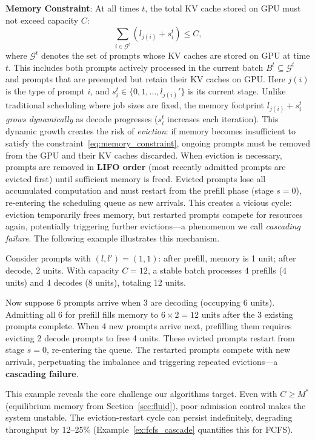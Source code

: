 \textbf{Memory Constraint}: At all times $t$, the total KV cache stored on GPU must not exceed capacity $C$:
\begin{equation}
\label{eq:memory_constraint}
\sum_{i \in \mathcal{G}^t} (l_{j(i)} + s^t_i) \le C,
\end{equation}
where $\mathcal{G}^t$ denotes the set of prompts whose KV caches are stored on GPU at time $t$. This includes both prompts actively processed in the current batch $B^t \subseteq \mathcal{G}^t$ and prompts that are preempted but retain their KV caches on GPU. Here $j(i)$ is the type of prompt $i$, and $s^t_i \in \{0, 1, \dots, l_{j(i)}'\}$ is its current stage. Unlike traditional scheduling where job sizes are fixed, the memory footprint $l_{j(i)} + s^t_i$ \textit{grows dynamically} as decode progresses ($s^t_i$ increases each iteration). This dynamic growth creates the risk of \textit{eviction}: if memory becomes insufficient to satisfy the constraint~\eqref{eq:memory_constraint}, ongoing prompts must be removed from the GPU and their KV caches discarded. When eviction is necessary, prompts are removed in \textbf{LIFO order} (most recently admitted prompts are evicted first) until sufficient memory is freed. Evicted prompts lose all accumulated computation and must restart from the prefill phase (stage $s=0$), re-entering the scheduling queue as new arrivals. This creates a vicious cycle: eviction temporarily frees memory, but restarted prompts compete for resources again, potentially triggering further evictions---a phenomenon we call \textit{cascading failure}. The following example illustrates this mechanism.

\begin{example}
\label{ex:memory_growth}
Consider prompts with $(l, l') = (1, 1)$: after prefill, memory is 1 unit; after decode, 2 units. With capacity $C=12$, a stable batch processes 4 prefills (4 units) and 4 decodes (8 units), totaling 12 units.

Now suppose 6 prompts arrive when 3 are decoding (occupying 6 units). Admitting all 6 for prefill fills memory to $6 \times 2 = 12$ units after the 3 existing prompts complete. When 4 new prompts arrive next, prefilling them requires evicting 2 decode prompts to free 4 units. These evicted prompts restart from stage $s=0$, re-entering the queue. The restarted prompts compete with new arrivals, perpetuating the imbalance and triggering repeated evictions---a \textbf{cascading failure}.

This example reveals the core challenge our algorithms target. Even with $C \geq M^*$ (equilibrium memory from Section~\ref{sec:fluid}), poor admission control makes the system unstable. The eviction-restart cycle can persist indefinitely, degrading throughput by 12--25\% (Example~\ref{ex:fcfs_cascade} quantifies this for FCFS).
\end{example}

